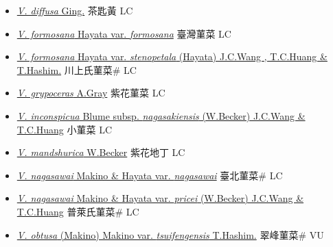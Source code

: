 \begin{itemize}
\begin{itemize}
        \item[] \href{http://www.theplantlist.org/tpl1.1/search?q=Viola+diffusa}{\textit{V. diffusa} Ging.}   茶匙黃 LC
        \item[] \href{http://www.theplantlist.org/tpl1.1/search?q=Viola+formosana+var.+formosana}{\textit{V. formosana} Hayata var. \textit{formosana}}   臺灣菫菜 LC
        \item[] \href{http://www.theplantlist.org/tpl1.1/search?q=Viola+formosana+var.+stenopetala}{\textit{V. formosana} Hayata var. \textit{stenopetala} (Hayata) J.C.Wang , T.C.Huang \& T.Hashim.}   川上氏菫菜\# LC
        \item[] \href{http://www.theplantlist.org/tpl1.1/search?q=Viola+grypoceras}{\textit{V. grypoceras} A.Gray}   紫花菫菜 LC
        \item[] \href{http://www.theplantlist.org/tpl1.1/search?q=Viola+inconspicua+subsp.+nagasakiensis}{\textit{V. inconspicua} Blume subsp. \textit{nagasakiensis} (W.Becker) J.C.Wang \& T.C.Huang}   小菫菜 LC
        \item[] \href{http://www.theplantlist.org/tpl1.1/search?q=Viola+mandshurica}{\textit{V. mandshurica} W.Becker}   紫花地丁 LC
        \item[] \href{http://www.theplantlist.org/tpl1.1/search?q=Viola+nagasawai+var.+nagasawai}{\textit{V. nagasawai} Makino \& Hayata var. \textit{nagasawai}}   臺北菫菜\# LC
        \item[] \href{http://www.theplantlist.org/tpl1.1/search?q=Viola+nagasawai+var.+pricei}{\textit{V. nagasawai} Makino \& Hayata var. \textit{pricei} (W.Becker) J.C.Wang \& T.C.Huang}   普萊氏菫菜\# LC
        \item[] \href{http://www.theplantlist.org/tpl1.1/search?q=Viola+obtusa+var.+tsuifengensis}{\textit{V. obtusa} (Makino) Makino var. \textit{tsuifengensis} T.Hashim.}   翠峰菫菜\# VU

\end{itemize}
\end{itemize}
